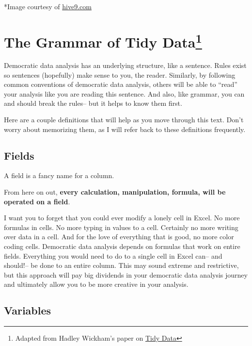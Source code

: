 \documentclass[
]{book}
\begin{document}
*Image courtesy of \href{https://www.hive9.com/blog/just-say-no-to-spreadsheets}{hive9.com}

\hypertarget{the-grammar-of-tidy-data}{%
\section[The Grammar of Tidy Data]{\texorpdfstring{The Grammar of Tidy Data\footnote{Adapted from Hadley Wickham's paper on \href{https://vita.had.co.nz/papers/tidy-data.pdf}{Tidy Data}}}{The Grammar of Tidy Data}}\label{the-grammar-of-tidy-data}}

Democratic data analysis has an underlying structure, like a sentence. Rules exist so sentences (hopefully) make sense to you, the reader. Similarly, by following common conventions of democratic data analysis, others will be able to ``read'' your analysis like you are reading this sentence. And also, like grammar, you can and should break the rules-- but it helps to know them first.

Here are a couple definitions that will help as you move through this text. Don't worry about memorizing them, as I will refer back to these definitions frequently.

\hypertarget{fields}{%
\subsection{Fields}\label{fields}}

A field is a fancy name for a column.

From here on out, \textbf{every calculation, manipulation, formula, will be operated on a field}.

I want you to forget that you could ever modify a lonely cell in Excel. No more formulas in cells. No more typing in values to a cell. Certainly no more writing over data in a cell. And for the love of everything that is good, no more color coding cells. Democratic data analysis depends on formulas that work on entire fields. Everything you would need to do to a single cell in Excel can-- and should!-- be done to an entire column. This may sound extreme and restrictive, but this approach will pay big dividends in your democratic data analysis journey and ultimately allow you to be more creative in your analysis.

\hypertarget{variables}{%
\subsection{Variables}\label{variables}}
\end{document}
